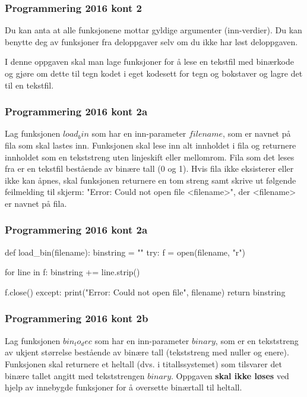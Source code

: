 
\begin{frame}
    \frametitle{Programmering 2016 kont 2}

    Du kan anta at alle funksjonene mottar gyldige argumenter (inn-verdier). Du kan benytte deg av funksjoner fra deloppgaver selv om du ikke har løst deloppgaven. 

    I denne oppgaven skal man lage funksjoner for å lese en tekstfil med binærkode og gjøre om dette til tegn kodet i eget kodesett for tegn og bokstaver og lagre det til en tekstfil.

\end{frame}


\begin{frame}
    \frametitle{Programmering 2016 kont 2a}

    Lag funksjonen $load_bin$ som har en inn-parameter $filename$, som er navnet på fila som skal lastes inn. Funksjonen skal lese inn alt innholdet i fila og returnere innholdet som en tekststreng uten linjeskift eller mellomrom. Fila som det leses fra er en tekstfil bestående av binære tall (0 og 1). Hvis fila ikke eksisterer eller ikke kan åpnes, skal funksjonen returnere en tom streng samt skrive ut følgende feilmelding til skjerm: "Error: Could not open file <filename>", der <filename> er navnet på fila. 

\end{frame}

\begin{frame}[fragile]
    \frametitle{Programmering 2016 kont 2a}

\begin{python}
def load_bin(filename):
    binstring = ""
    try:
        f = open(filename, "r")

        for line in f: 
            binstring += line.strip()
        
        f.close()
    except:
        print("Error: Could not open file", filename)
    return binstring
\end{python}

\end{frame}

\begin{frame}
    \frametitle{Programmering 2016 kont 2b}

    Lag funksjonen $bin_to_dec$ som har en inn-parameter $binary$, som er en tekststreng av ukjent størrelse bestående av binære tall (tekststreng med nuller og enere). Funksjonen skal returnere et heltall (dvs. i titallssystemet) som tilsvarer det binære tallet angitt med tekststrengen $binary$. Oppgaven \textbf{skal ikke løses} ved hjelp av innebygde funksjoner for å oversette binærtall til heltall. 

\end{frame}

